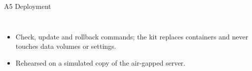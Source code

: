 \documentclass[aspectratio=169,10pt]{beamer}
\begin{document}
\begin{frame}{A5 Deployment}
\begin{columns}[T,onlytextwidth]
\begin{itemize}
\item Check, update and rollback commands; the kit replaces containers and never touches data volumes or settings.
\item Rehearsed on a simulated copy of the air-gapped server.
\end{itemize}
\vspace{1.5mm}
\par\vspace{0.3mm}
\par
\end{columns}
\end{frame}
\end{document}
